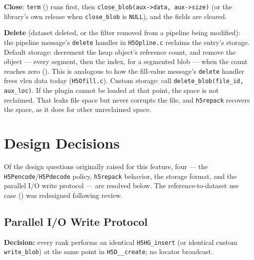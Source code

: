 \documentclass[../RFC-HDFG-2026-003.tex]{subfiles}
\begin{document}
\textbf{Close}: \texttt{term} () runs first, then
\texttt{close\_blob(aux->data, aux->size)} (or the library's own release
when \texttt{close\_blob} is \texttt{NULL}), and the fields are cleared.

\textbf{Delete} (dataset deleted, or the filter removed from a pipeline
being modified): the pipeline message's \texttt{delete} handler in
\texttt{H5Opline.c} reclaims the entry's storage.  Default storage:
decrement the heap object's reference count, and remove the object ---
every segment, then the index, for a segmented blob --- when the count
reaches zero ().  This is analogous to how
the fill-value message's \texttt{delete} handler frees vlen data today
(\texttt{H5Ofill.c}).  Custom storage: call
\texttt{delete\_blob(file\_id, aux\_loc)}.  If the plugin cannot be
loaded at that point, the space is not reclaimed.  That leaks file space
but never corrupts the file, and \texttt{h5repack} recovers the space, as
it does for other unreclaimed space.


\section{Design Decisions}
\label{sec:decisions}

Of the design questions originally raised for this feature, four ---
the \texttt{H5Pencode}/\texttt{H5Pdecode} policy, \texttt{h5repack}
behavior, the storage format, and the parallel I/O write protocol ---
are resolved below. The reference-to-dataset use case
() was redesigned following review.

\subsection{Parallel I/O Write Protocol}
\label{sec:blob-parallel}

\noindent\textbf{Decision:} every rank performs an identical
\texttt{H5HG\_insert} (or identical custom \texttt{write\_blob}) at the
same point in \texttt{H5D\_\_create}; no locator broadcast.

\end{document}
